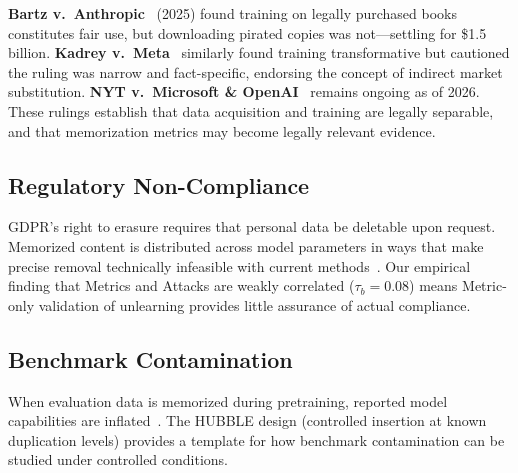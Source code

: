 \documentclass[11pt]{article}
\begin{document}
\textbf{Bartz v.\ Anthropic}~\citep{bartz_v_anthropic_2025} (2025) found
training on legally purchased books constitutes fair use, but downloading
pirated copies was not---settling for \$1.5 billion.
\textbf{Kadrey v.\ Meta}~\citep{kadrey_v_meta_2025} similarly found training
transformative but cautioned the ruling was narrow and fact-specific,
endorsing the concept of indirect market substitution.
\textbf{NYT v.\ Microsoft \& OpenAI}~\citep{nytimes_v_microsoft_2023} remains
ongoing as of 2026.
These rulings establish that data acquisition and training are legally
separable, and that memorization metrics may become legally relevant evidence.

\subsection{Regulatory Non-Compliance}

GDPR's right to erasure requires that personal data be deletable upon request.
Memorized content is distributed across model parameters in ways that make
precise removal technically infeasible with current
methods~\citep{schwarzschild2024rethinking}.
Our empirical finding that Metrics and Attacks are weakly correlated ($\tau_b =
0.08$) means Metric-only validation of unlearning provides little assurance of
actual compliance.

\subsection{Benchmark Contamination}

When evaluation data is memorized during pretraining, reported model
capabilities are inflated~\citep{magar2022data}.
The HUBBLE design (controlled insertion at known duplication levels) provides
a template for how benchmark contamination can be studied under controlled
conditions.
\end{document}
